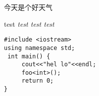 \documentclass[12pt,hyperref,UTF8]{ctexbook}
\begin{document}
今天是个好天气

{
test \itshape test \ttfamily test \upshape test
}

{

\lstset{language=C++,
basicstyle=\footnotesize\ttfamily,
showstringspaces=true
}
\begin{lstlisting}
#include <iostream>
using namespace std;
 int main() {
     cout<<"hel lo"<<endl;
     foo<int>();
     return 0;
}
\end{lstlisting}

}
\end{document}
